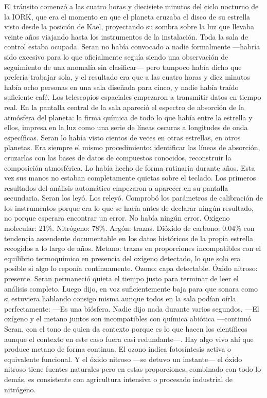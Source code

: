 \documentclass[11pt,a5paper,twoside]{book}
\begin{document}
El tránsito comenzó a las cuatro horas y diecisiete minutos del ciclo nocturno de la IORK, que era el momento en que el planeta cruzaba el disco de su estrella visto desde la posición de Kael, proyectando su sombra sobre la luz que llevaba veinte años viajando hasta los instrumentos de la instalación.
Toda la sala de control estaba ocupada. Seran no había convocado a nadie formalmente —habría sido excesivo para lo que oficialmente seguía siendo una observación de seguimiento de una anomalía sin clasificar— pero tampoco había dicho que prefería trabajar sola, y el resultado era que a las cuatro horas y diez minutos había ocho personas en una sala diseñada para cinco, y nadie había traído suficiente café.
Los telescopios espaciales empezaron a transmitir datos en tiempo real. En la pantalla central de la sala apareció el espectro de absorción de la atmósfera del planeta: la firma química de todo lo que había entre la estrella y ellos, impresa en la luz como una serie de líneas oscuras a longitudes de onda específicas.
Seran lo había visto cientos de veces en otras estrellas, en otros planetas. Era siempre el mismo procedimiento: identificar las líneas de absorción, cruzarlas con las bases de datos de compuestos conocidos, reconstruir la composición atmosférica. Lo había hecho de forma rutinaria durante años. Esta vez sus manos no estaban completamente quietas sobre el teclado.
Los primeros resultados del análisis automático empezaron a aparecer en su pantalla secundaria. Seran los leyó. Los releyó. Comprobó los parámetros de calibración de los instrumentos porque era lo que se hacía antes de declarar ningún resultado, no porque esperara encontrar un error.
No había ningún error.
Oxígeno molecular: 21\%. Nitrógeno: 78\%. Argón: trazas. Dióxido de carbono: 0.04\% con tendencia ascendente documentable en los datos históricos de la propia estrella recogidos a lo largo de años. Metano: trazas en proporciones incompatibles con el equilibrio termoquímico en presencia del oxígeno detectado, lo que solo era posible si algo lo reponía continuamente. Ozono: capa detectable. Óxido nitroso: presente.
Seran permaneció quieta el tiempo justo para terminar de leer el análisis completo.
Luego dijo, en voz suficientemente baja para que sonara como si estuviera hablando consigo misma aunque todos en la sala podían oírla perfectamente:
—Es una biósfera.
Nadie dijo nada durante varios segundos.
—El oxígeno y el metano juntos son incompatibles con química abiótica —continuó Seran, con el tono de quien da contexto porque es lo que hacen los científicos aunque el contexto en este caso fuera casi redundante—. Hay algo vivo ahí que produce metano de forma continua. El ozono indica fotosíntesis activa o equivalente funcional. Y el óxido nitroso —se detuvo un instante— el óxido nitroso tiene fuentes naturales pero en estas proporciones, combinado con todo lo demás, es consistente con agricultura intensiva o procesado industrial de nitrógeno.
\end{document}
